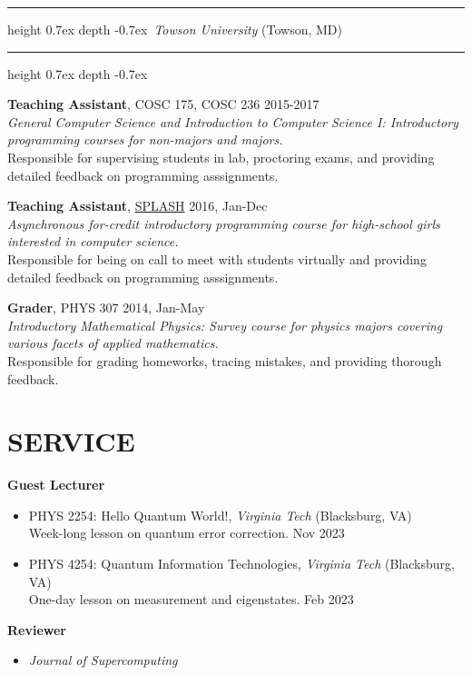 \documentclass[marginmode, 10pt]{res} %
\def\Vhrulefill{\leavevmode\leaders\hrule height 0.7ex depth \dimexpr0.4pt-0.7ex\hfill\kern0pt}         %
\begin{document}
\begin{resume}
\Vhrulefill ~\textit{Towson University} (Towson, MD)~ \Vhrulefill

\textbf{Teaching Assistant}, COSC 175, COSC 236 \hfill 2015-2017 \\
\textit{General Computer Science and Introduction to Computer Science I: Introductory programming courses for non-majors and majors.} \\
Responsible for supervising students in lab, proctoring exams, and providing detailed feedback on programming asssignments.

\textbf{Teaching Assistant}, \href{https://wp.towson.edu/secured-lab/home-page/splash-about/}{SPLASH} \hfill 2016, Jan-Dec \\
\textit{Asynchronous for-credit introductory programming course for high-school girls interested in computer science.} \\
Responsible for being on call to meet with students virtually and providing detailed feedback on programming asssignments.

\textbf{Grader}, PHYS 307 \hfill 2014, Jan-May \\
\textit{Introductory Mathematical Physics: Survey course for physics majors covering various facets of applied mathematics.} \\
Responsible for grading homeworks, tracing mistakes, and providing thorough feedback.



\pagebreak

\section{\small{SERVICE}}

\textbf{Guest Lecturer}
\begin{itemize}
    \item PHYS 2254: Hello Quantum World!, \textit{Virginia Tech} (Blacksburg, VA) \\
    Week-long lesson on quantum error correction. \hfill Nov 2023
    \item PHYS 4254: Quantum Information Technologies, \textit{Virginia Tech} (Blacksburg, VA) \\
    One-day lesson on measurement and eigenstates. \hfill Feb 2023
\end{itemize}

\textbf{Reviewer}
\begin{itemize}
    \item \textit{Journal of Supercomputing}
\end{itemize}


\end{resume}
\end{document}
